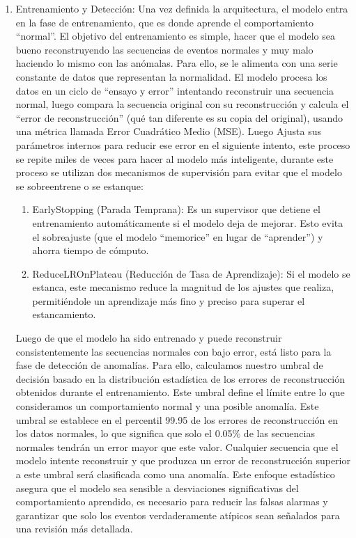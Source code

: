 \begin{enumerate}
            \item Entrenamiento y Detección:
                  Una vez definida la arquitectura, el modelo entra en la fase de entrenamiento, que es donde aprende el comportamiento ``normal''. El objetivo del entrenamiento es simple, hacer que el modelo sea bueno reconstruyendo las secuencias de eventos normales y muy malo haciendo lo mismo con las anómalas. Para ello, se le alimenta con una serie constante de datos que representan la normalidad.
                  El modelo procesa los datos en un ciclo de ``ensayo y error'' intentando reconstruir una secuencia normal, luego compara la secuencia original con su reconstrucción y calcula el ``error de reconstrucción'' (qué tan diferente es su copia del original), usando una métrica llamada Error Cuadrático Medio (MSE). Luego Ajusta sus parámetros internos para reducir ese error en el siguiente intento, este proceso se repite miles de veces para hacer al modelo más inteligente, durante este proceso se utilizan dos mecanismos de supervisión para evitar que el modelo se sobreentrene o se estanque:
                  \begin{enumerate}
                        \item EarlyStopping (Parada Temprana): Es un supervisor que detiene el entrenamiento automáticamente si el modelo deja de mejorar. Esto evita el sobreajuste (que el modelo ``memorice'' en lugar de ``aprender'') y ahorra tiempo de cómputo.

                        \item ReduceLROnPlateau (Reducción de Tasa de Aprendizaje): Si el modelo se estanca, este mecanismo reduce la magnitud de los ajustes que realiza, permitiéndole un aprendizaje más fino y preciso para superar el estancamiento.
                  \end{enumerate}

                  Luego de que el modelo ha sido entrenado y puede reconstruir consistentemente las secuencias normales con bajo error, está listo para la fase de detección de anomalías. Para ello, calculamos nuestro umbral de decisión basado en la distribución estadística de los errores de reconstrucción obtenidos durante el entrenamiento. Este umbral define el límite entre lo que consideramos un comportamiento normal y una posible anomalía. Este umbral se establece en el percentil 99.95 de los errores de reconstrucción en los datos normales, lo que significa que solo el 0.05\% de las secuencias normales tendrán un error mayor que este valor.
                  Cualquier secuencia que el modelo intente reconstruir y que produzca un error de reconstrucción superior a este umbral será clasificada como una anomalía. Este enfoque estadístico asegura que el modelo sea sensible a desviaciones significativas del comportamiento aprendido, es necesario para reducir las falsas alarmas y garantizar que solo los eventos verdaderamente atípicos sean señalados para una revisión más detallada.
      \end{enumerate} 

